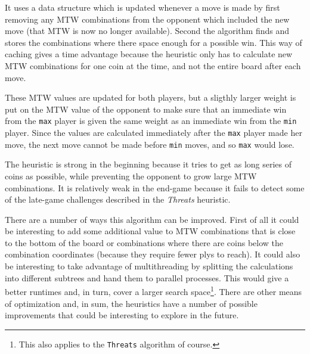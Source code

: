 \documentclass[a4paper, titlepage]{article}
\begin{document}
It uses a data structure which is updated whenever a move is made by first 
removing any MTW combinations from the opponent which included the new move (that MTW is 
now no longer available). Second the algorithm finds and stores the combinations where 
there space enough for a possible win.
This way of caching gives a time advantage because the heuristic only has to calculate new MTW 
combinations for one coin at the time, and not the entire board after each move.

These MTW values are updated for both players, but a sligthly larger weight is put on the 
MTW value of the opponent to make sure that an immediate win from the \texttt{max} player 
is given the same weight as an immediate win from the \texttt{min} player. Since the values 
are calculated immediately after the \texttt{max} player made her move, the next move cannot
be made before \texttt{min} moves, and so \texttt{max} would lose.

The heuristic is strong in the beginning because it tries to get as long series of coins
as possible, while preventing the opponent to grow large MTW combinations. It is 
relatively weak in the end-game because it fails to detect some of the late-game challenges 
described in the \textit{Threats} heuristic. 

There are a number of ways this algorithm can be improved. First of all it could be
interesting to add some additional value to MTW combinations that is close to the bottom of
the board or combinations where there are coins below the combination coordinates 
(because they require fewer plys to reach). It could also be interesting to take advantage
of multithreading by splitting the calculations into different subtrees and hand them to 
parallel processes. This would give a better runtimes and, in turn,
cover a larger search space\footnote{This also applies to the \texttt{Threats} algorithm
of course.}. There are other means of optimization and, in sum, the heuristics have a 
number of possible improvements that could be interesting to explore in the future.
\end{document}

